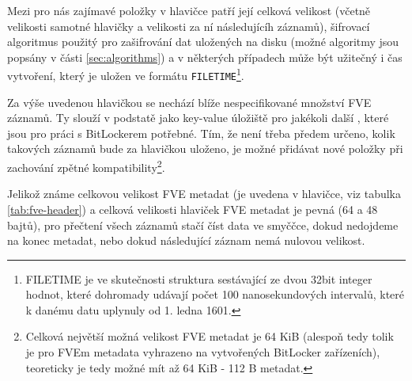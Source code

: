 
Mezi pro nás zajímavé položky v hlavičce patří její celková velikost (včetně velikosti samotné hlavičky a velikosti za ní následujícíh záznamů), šifrovací algoritmus použitý pro zašifrování dat uložených na disku (možné algoritmy jsou popsány v části \ref{sec:algorithms}) a v některých případech může být užitečný i čas vytvoření, který je uložen ve formátu \texttt{FILETIME}\footnote{FILETIME je ve skutečnosti struktura sestávající ze dvou 32bit integer hodnot, které dohromady udávají počet 100 nanosekundových intervalů, které k danému datu uplynuly od 1. ledna 1601.\cite{Zxwr6wjYZUQ6z8Yp}}.

\label{sec:fve-metadata-entry}

Za výše uvedenou hlavičkou se nechází blíže nespecifikované množství FVE záznamů. Ty slouží v podstatě jako key-value úložiště pro jakékoli další , které jsou pro práci s BitLockerem potřebné. Tím, že není třeba předem určeno, kolik takových záznamů bude za hlavičkou uloženo, je možné přidávat nové položky při zachování zpětné kompatibility\footnote{Celková největší možná velikost FVE metadat je 64 KiB (alespoň tedy tolik je pro FVEm metadata vyhrazeno na vytvořených BitLocker zařízeních), teoreticky je tedy možné mít až 64 KiB - 112 B metadat.}.

Jelikož známe celkovou velikost FVE metadat (je uvedena v hlavičce, viz tabulka \ref{tab:fve-header}) a celková velikosti hlaviček FVE metadat je pevná (64 a 48 bajtů), pro přečtení všech záznamů stačí číst data ve smyččce, dokud nedojdeme na konec metadat, nebo dokud následující záznam nemá nulovou velikost.

